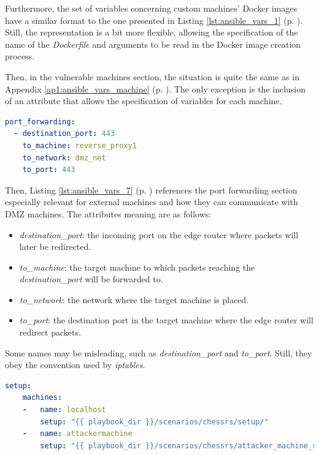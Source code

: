Furthermore, the set of variables concerning custom machines' Docker images have a similar format to the one presented in Listing \ref{lst:ansible_vars_1} (p. \pageref{lst:ansible_vars_1}). Still, the representation is a bit more flexible, allowing the specification of the name of the \textit{Dockerfile} and arguments to be read in the Docker image creation process.

Then, in the vulnerable machines section, the situation is quite the same as in Appendix \ref{ap1:ansible_vars_machine} (p. \pageref{ap1:ansible_vars_machine}). The only exception is the inclusion of an attribute that allows the specification of variables for each machine.

\begin{lstlisting}[language=yaml,caption=Ansible Variables - Port Forwarding.,numbers=none,label={lst:ansible_vars_7}]
port_forwarding:
  - destination_port: 443
    to_machine: reverse_proxy1
    to_network: dmz_net
    to_port: 443
\end{lstlisting}

Then, Listing \ref{lst:ansible_vars_7} (p. \pageref{lst:ansible_vars_7}) references the port forwarding section especially relevant for external machines and how they can communicate with DMZ machines. The attributes meaning are as follows: 

\begin{itemize}
    \item \textit{destination\_port}: the incoming port on the edge router where packets will later be redirected.
    \item \textit{to\_machine}: the target machine to which packets reaching the \textit{destination\_port} will be forwarded to.
    \item \textit{to\_network}: the network where the target machine is placed.
    \item \textit{to\_port}: the destination port in the target machine where the edge router will redirect packets.
\end{itemize}

Some names may be misleading, such as \textit{destination\_port} and \textit{to\_port}. Still, they obey the convention used by \textit{iptables}.

\begin{lstlisting}[language=yaml,caption=Ansible Variables - Setup Section.,numbers=none,label={lst:ansible_vars_8}]
setup:
    machines:
    -   name: localhost
        setup: "{{ playbook_dir }}/scenarios/chessrs/setup/"
    -   name: attackermachine
        setup: "{{ playbook_dir }}/scenarios/chessrs/attacker_machine_setup/*.j2"
\end{lstlisting}

